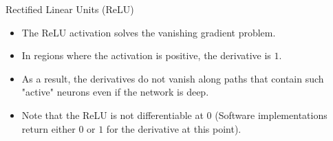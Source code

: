 \begin{frame} {Rectified Linear Units (ReLU)}
  \begin{itemize}
    \item The ReLU activation solves the vanishing gradient problem.
    \begin{figure}
      \centering
    \end{figure}
    \item In regions where the activation is positive, the derivative is $1$. 
    \item As a result, the derivatives do not vanish along paths that contain such "active" neurons even if the network is deep.
    \item Note that the ReLU is not differentiable at 0 (Software implementations return either $0$ or $1$ for the derivative at this point).
  \end{itemize}
\end{frame}


